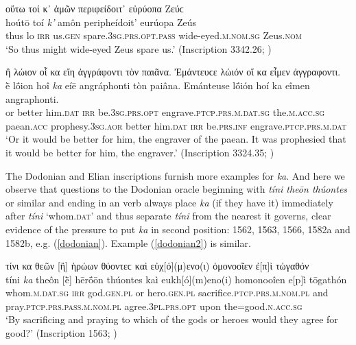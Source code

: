\begin{exe}
\ex οὕτω τοί κ᾽ ἀμῶν περιφείδοιτ᾽ εὐρύοπα Ζεύϲ\\
\gll hoútō toí \emph{k'} amôn peripheídoit' eurúopa Zeús\\
thus lo \textsc{irr} us.\textsc{gen} spare.\textsc{3sg.prs.opt.pass}
wide-eyed.\textsc{m.nom.sg} Zeus.\textsc{nom}\\
\trans `So thus might wide-eyed Zeus spare us.' (Inscription 3342.26; \citealp[162--166]{Prellwitz1889})
\label{Isyllus26}
\end{exe}

\begin{exe}
\ex ἢ λώιον οἷ κα εἴη ἀγγράφοντι τὸν παιᾶνα. Ἐμάντευϲε λώιόν οἵ κα εἶμεν ἀγγραφοντι.\\
\gll ḕ lṓion hoî \emph{ka} eíē angráphonti tòn paiâna. Emánteuse lṓión hoí ka eîmen angraphonti.\\
or better him.\textsc{dat} \textsc{irr} be.\textsc{3sg.prs.opt} engrave.\textsc{ptcp.prs.m.dat.sg} the.\textsc{m.acc.sg} paean.\textsc{acc} prophesy.\textsc{3sg.aor} better him.\textsc{dat} \textsc{irr} be.\textsc{prs.inf}
engrave.\textsc{ptcp.prs.m.dat}\\
\trans `Or it would be better for him, the engraver of the paean. It was prophesied that it would be better for him, the engraver.' (Inscription 3324.35; \citealp[162--166]{Prellwitz1889})
\label{Isyllus35}
\end{exe}

The Dodonian and Elian inscriptions furnish more examples for \textit{ka}. And here we observe that questions to the Dodonian oracle beginning with \textit{tíni theōn thúontes} or similar and ending in an  verb always place \textit{ka} (if they have it) immediately after \textit{tíni} `whom.\textsc{dat}' and thus separate \textit{tíni} from the nearest  it governs, clear evidence of the pressure to put \textit{ka} in second position: \citet{Hoffmann1890} 1562, 1563, 1566, 1582a and 1582b, e.g. (\ref{dodonian}). Example (\ref{dodonian2})
is similar.

\begin{exe}
\ex τίνι κα θεῶν {[ἢ{]} ἡρώων θύοντεϲ καὶ εὐχ{[}ό{]}(μ)ενο(ι)
ὁμονοοῖεν ἐ{[}π{]}ὶ τὠγαθόν}\\
\gll tíni \emph{ka} theôn {[}ḕ{]} hērṓōn thúontes kaì eukh{[}ó{]}(m)eno(i) homonooîen e{[}p{]}ì tōgathón\\
whom.\textsc{m.dat.sg} \textsc{irr} god.\textsc{gen.pl} or hero.\textsc{gen.pl}
sacrifice.\textsc{ptcp.prs.m.nom.pl} and pray.\textsc{ptcp.prs.pass.m.nom.pl} agree.\textsc{3pl.prs.opt} upon the=good.\textsc{n.acc.sg}\\
\trans `By sacrificing and praying to which of the gods or heroes would they agree for good?' (Inscription 1563; \citealp{Hoffmann1890})
\label{dodonian}
\end{exe}

